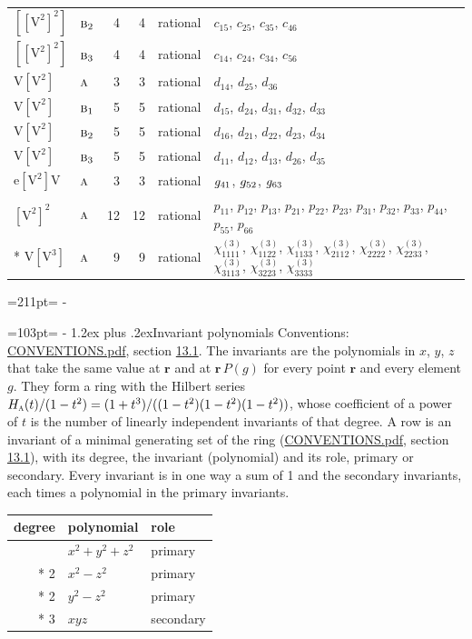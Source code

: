 \documentclass[10pt,a4paper]{article}
\makeatletter
\renewcommand\section{\@startsection{section}{1}{\z@}{-3ex plus -1ex minus -.2ex}%
  {1.2ex plus .2ex}{\normalfont\large\sffamily\bfseries\color{parttitle}}}
\newcommand{\needspace}[1]{\par\penalty-100\begingroup\dimen0=#1\relax\dimen2=\pagegoal
  \advance\dimen2-\pagetotal\ifdim\dimen0>\dimen2\relax\ifdim\dimen2>0pt\vfil\break\fi\fi
  \endgroup}
\numberwithin{equation}{section}
\newcommand{\irr}[1]{\text{\normalfont\scshape #1}}
\newcommand{\pointr}{\mathbf{r}}
\newcommand{\jahn}[1]{\mathrm{#1}}
\newlength{\fillwidth}\newlength{\cellwidth}\newlength{\colwidth}
\makeatother
\begin{document}
{\begin{longtable}{@{}llrrl>{\RaggedRight\arraybackslash}p{\fillwidth}@{}}
$\jahn{[[V^{2}]^{2}]}$ & $\irr{b}_{2}$ & 4 & 4 & rational & $c_{15}$, $c_{25}$, $c_{35}$, $c_{46}$\\
$\jahn{[[V^{2}]^{2}]}$ & $\irr{b}_{3}$ & 4 & 4 & rational & $c_{14}$, $c_{24}$, $c_{34}$, $c_{56}$\\
$\jahn{V[V^{2}]}$ & $\irr{a}$ & 3 & 3 & rational & $d_{14}$, $d_{25}$, $d_{36}$\\
$\jahn{V[V^{2}]}$ & $\irr{b}_{1}$ & 5 & 5 & rational & $d_{15}$, $d_{24}$, $d_{31}$, $d_{32}$, $d_{33}$\\
$\jahn{V[V^{2}]}$ & $\irr{b}_{2}$ & 5 & 5 & rational & $d_{16}$, $d_{21}$, $d_{22}$, $d_{23}$, $d_{34}$\\
$\jahn{V[V^{2}]}$ & $\irr{b}_{3}$ & 5 & 5 & rational & $d_{11}$, $d_{12}$, $d_{13}$, $d_{26}$, $d_{35}$\\
$\jahn{e[V^{2}]V}$ & $\irr{a}$ & 3 & 3 & rational & $\mathnormal{g}_{41}$, $\mathnormal{g}_{52}$, $\mathnormal{g}_{63}$\\
$\jahn{[V^{2}]^{2}}$ & $\irr{a}$ & 12 & 12 & rational & $p_{11}$, $p_{12}$, $p_{13}$, $p_{21}$, $p_{22}$, $p_{23}$, $p_{31}$, $p_{32}$, $p_{33}$, $p_{44}$, $p_{55}$, $p_{66}$\\*
$\jahn{V[V^{3}]}$ & $\irr{a}$ & 9 & 9 & rational & $\chi^{(3)}_{1111}$, $\chi^{(3)}_{1122}$, $\chi^{(3)}_{1133}$, $\chi^{(3)}_{2112}$, $\chi^{(3)}_{2222}$, $\chi^{(3)}_{2233}$, $\chi^{(3)}_{3113}$, $\chi^{(3)}_{3223}$, $\chi^{(3)}_{3333}$\\
\bottomrule\end{longtable}}
\needspace{211pt}
\needspace{103pt}
\section{Invariant polynomials}\label{s:invariant_polynomials}
Conventions: \href{../../CONVENTIONS.pdf}{CONVENTIONS.pdf}, section \href{../../CONVENTIONS.pdf\#conv.13.1}{13.1}.
The invariants are the polynomials in $x$, $y$, $z$ that take the same value at $\pointr$ and at $\pointr\,P(g)$ for every point $\pointr$ and every element $g$. They form a ring with the Hilbert series $H_{\irr{a}}(t)/(1-t^{2}) = (1 + t^{3})/((1-t^{2})(1-t^{2})(1-t^{2}))$, whose coefficient of a power of $t$ is the number of linearly independent invariants of that degree. \label{n:head.degree}\label{n:head.role}A row is an invariant of a minimal generating set of the ring (\href{../../CONVENTIONS.pdf}{CONVENTIONS.pdf}, section \href{../../CONVENTIONS.pdf\#conv.13.1}{13.1}), with its degree, the invariant (polynomial) and its role, primary or secondary. Every invariant is in one way a sum of 1 and the secondary invariants, each times a polynomial in the primary invariants.
{\small\begin{longtable}{@{}rll@{}}\toprule
degree & polynomial & role\\\midrule\endhead
\bottomrule\endfoot\endlastfoot
2 & $x^{2} + y^{2} + z^{2}$ & primary\\*
2 & $x^{2} - z^{2}$ & primary\\*
2 & $y^{2} - z^{2}$ & primary\\*
3 & $xyz$ & secondary\\
\bottomrule\end{longtable}}
\end{document}
